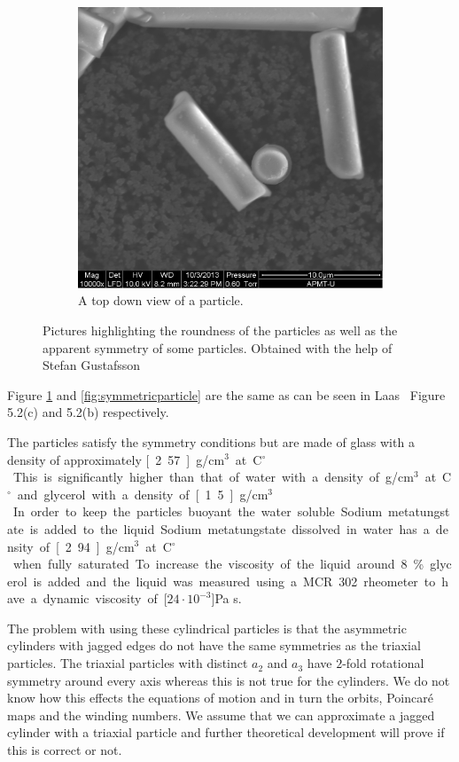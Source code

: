 \begin{figure}[H]
\begin{subfigure}[3b]{0.40\textwidth}
\includegraphics[width=\textwidth]{figures/method/round.png}
\caption{A top down view of a particle.}\label{fig:roundparticle}
\end{subfigure}
\caption{Pictures highlighting the roundness of the particles as well as the apparent symmetry of some particles. Obtained with the help of Stefan Gustafsson}
\label{fig:particlepictures2}
\end{figure}

Figure \ref{fig:roundparticle} and \ref{fig:symmetricparticle} are the same as can be seen in Laas~\cite{alexanderThesis} Figure 5.2(c) and 5.2(b) respectively. 

The particles satisfy the symmetry conditions but are made of glass with a density of approximately 
\unit[2.57]{g/cm$^3$} at \unit[20]{C$^\circ$}. This is significantly higher than that of water with a density of 
\unit[1]{g/cm$^3$} at \unit[20]{C$^\circ$} and glycerol with a density of \unit[1.5]{g/cm$^3$}. In order to keep the particles buoyant the water soluble Sodium metatungstate is added to the liquid. Sodium metatungstate dissolved in water has a density of \unit[2.94]{g/cm$^3$} at \unit[20]{C$^\circ$} when fully saturated. To increase the viscosity of the liquid around 8\% glycerol is added and the liquid was measured using a MCR 302 rheometer to have a dynamic viscosity of \unit[$24\cdot 10^{-3}$]{Pa s}.

The problem with using these cylindrical particles is that the asymmetric cylinders with jagged edges do not have the same symmetries as the triaxial particles. The triaxial particles with distinct $a_2$ and $a_3$ have $2$-fold rotational symmetry around every axis whereas this is not true for the cylinders. We do not know how this effects the equations of motion and in turn the orbits, Poincaré maps and the winding numbers. We assume that we can approximate a jagged cylinder with a triaxial particle and further theoretical development will prove if this is correct or not.
